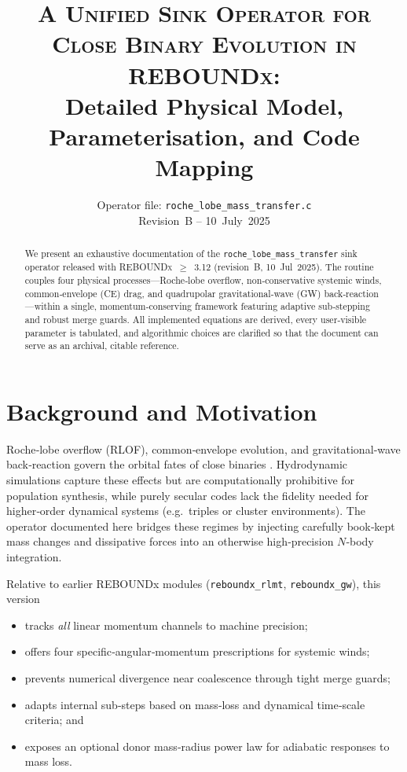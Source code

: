 \documentclass[11pt]{article}
\begin{document}
\title{\textsc{A Unified Sink Operator for Close Binary Evolution in
         \textnormal{REBOUNDx}}:\\
       Detailed Physical Model, Parameterisation, and Code Mapping}
\author{Operator file: \texttt{roche\_lobe\_mass\_transfer.c}\\
        Revision B – 10 July 2025}
\date{}
\maketitle
\vspace*{-1.5em}

\begin{abstract}
We present an exhaustive documentation of the
\texttt{roche\_lobe\_mass\_transfer} sink operator released with
\textsc{REBOUNDx} $\ge$ 3.12 (revision B, 10 Jul 2025).  
The routine couples four physical processes—Roche‑lobe overflow,
non‑conservative systemic winds, common‑envelope (CE) drag, and
quadrupolar gravitational‑wave (GW) back‑reaction—within a single,
momentum‑conserving framework featuring adaptive sub‑stepping and robust
merge guards.
All implemented equations are derived, every user‑visible parameter is
tabulated, and algorithmic choices are clarified so that the document can
serve as an archival, citable reference.
\end{abstract}

\section{Background and Motivation}
\label{sec:intro}
Roche‑lobe overflow (RLOF), common‑envelope evolution, and gravitational‑wave
back‑reaction govern the orbital fates of close binaries
\citep{Eggleton1983,Ostriker1999,Peters1964}.
Hydrodynamic simulations capture these effects but are
computationally prohibitive for population synthesis, while purely secular
codes lack the fidelity needed for higher‑order dynamical systems
(e.g.\ triples or cluster environments).
The operator documented here bridges these regimes by injecting carefully
book‑kept mass changes and dissipative forces into an otherwise
high‑precision $N$‑body integration.

Relative to earlier REBOUNDx modules
(\texttt{reboundx\_rlmt}, \texttt{reboundx\_gw}), this version

\begin{itemize}[nosep,leftmargin=1.8em]
\item tracks \emph{all} linear momentum channels to machine precision;
\item offers four specific‑angular‑momentum prescriptions for systemic winds;
\item prevents numerical divergence near coalescence through tight merge guards;
\item adapts internal sub‑steps based on mass‑loss and dynamical
      time‑scale criteria; and
\item exposes an optional donor mass‑radius power law for adiabatic
      responses to mass loss.
\end{itemize}
\end{document}
